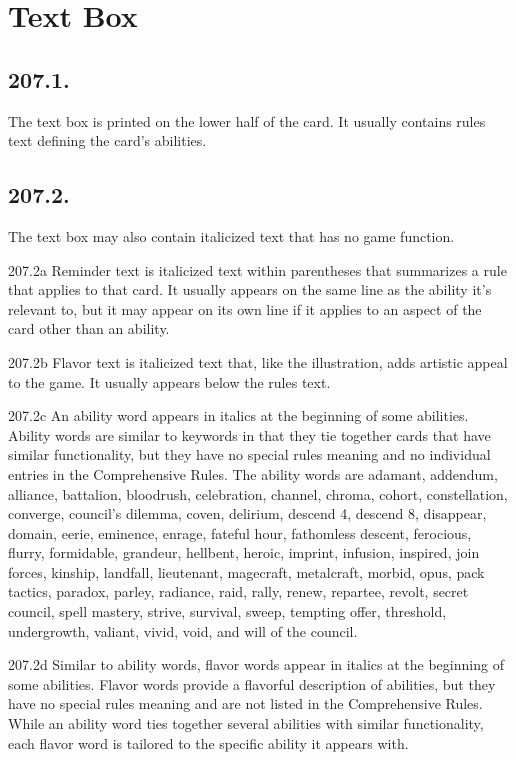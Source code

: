 \section{Text Box}
\subsection*{207.1.}
The text box is printed on the lower half of the card. It usually contains rules text defining the card’s abilities.

\subsection*{207.2.}
The text box may also contain italicized text that has no game function.

207.2a Reminder text is italicized text within parentheses that summarizes a rule that applies to that card. It usually appears on the same line as the ability it’s relevant to, but it may appear on its own line if it applies to an aspect of the card other than an ability.

207.2b Flavor text is italicized text that, like the illustration, adds artistic appeal to the game. It usually appears below the rules text.

207.2c An ability word appears in italics at the beginning of some abilities. Ability words are similar to keywords in that they tie together cards that have similar functionality, but they have no special rules meaning and no individual entries in the Comprehensive Rules. The ability words are adamant, addendum, alliance, battalion, bloodrush, celebration, channel, chroma, cohort, constellation, converge, council’s dilemma, coven, delirium, descend 4, descend 8, disappear, domain, eerie, eminence, enrage, fateful hour, fathomless descent, ferocious, flurry, formidable, grandeur, hellbent, heroic, imprint, infusion, inspired, join forces, kinship, landfall, lieutenant, magecraft, metalcraft, morbid, opus, pack tactics, paradox, parley, radiance, raid, rally, renew, repartee, revolt, secret council, spell mastery, strive, survival, sweep, tempting offer, threshold, undergrowth, valiant, vivid, void, and will of the council.

207.2d Similar to ability words, flavor words appear in italics at the beginning of some abilities. Flavor words provide a flavorful description of abilities, but they have no special rules meaning and are not listed in the Comprehensive Rules. While an ability word ties together several abilities with similar functionality, each flavor word is tailored to the specific ability it appears with.

